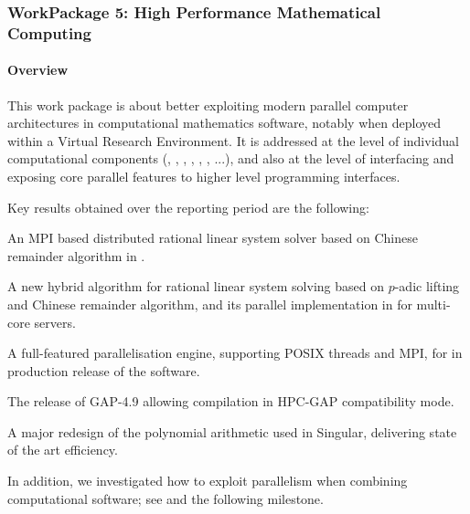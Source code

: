 \subsubsection{WorkPackage 5: High Performance Mathematical Computing}
  \label{hpc}


  \paragraph{Overview}

  This work package is about better exploiting modern parallel
  computer architectures in computational mathematics software,
  notably when deployed within a Virtual Research Environment. It is
  addressed at the level of individual computational components
  (\Pari, \GAP, \Linbox, \MPIR, \Sage, \Singular, ...), and also at
  the level of interfacing and exposing core parallel features to
  higher level programming interfaces.

  Key results obtained over the reporting period are the following:
  \begin{compactitem}
  \item An MPI based distributed  rational linear system solver based on Chinese remainder algorithm in \Linbox.
  \item A new hybrid algorithm for rational linear system solving based on $p$-adic lifting and Chinese remainder
    algorithm, and its parallel implementation in \Linbox for multi-core servers.
  \item A full-featured parallelisation engine, supporting POSIX threads and
    MPI, for \PariGP in production release of the software.
  \item The release of GAP-4.9 allowing compilation  in HPC-GAP compatibility mode.
  \item A major redesign of the polynomial arithmetic used in Singular,
    delivering state of the art efficiency.
  \end{compactitem}
  In addition, we investigated how to exploit parallelism when
  combining computational software; see
   and
  the following milestone.

